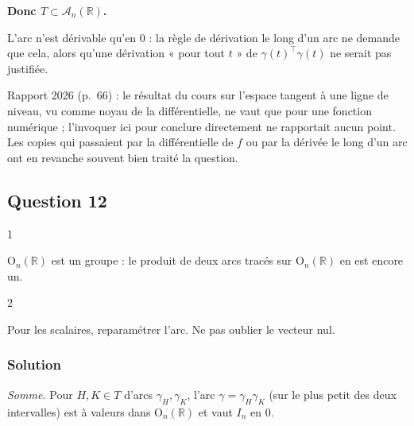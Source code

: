 \documentclass[11pt,a4paper]{article}
\begin{document}
\textbf{Donc \(T\subset{\mathcal{A}}_n(\mathbb{R})\).}

\begin{piege}

L'arc n'est dérivable qu'en 0 : la règle de dérivation le long d'un arc ne demande que cela, alors qu'une dérivation « pour tout \(t\) » de \(\gamma(t)^\top\gamma(t)\) ne serait pas justifiée.

\end{piege}

\begin{jury}

Rapport 2026 (p.~66) : le résultat du cours sur l'espace tangent à une ligne de niveau, vu comme noyau de la différentielle, ne vaut que pour une fonction numérique ; l'invoquer ici pour conclure directement ne rapportait aucun point. Les copies qui passaient par la différentielle de \(f\) ou par la dérivée le long d'un arc ont en revanche souvent bien traité la question.

\end{jury}

\hypertarget{question-12}{%
\subsection{Question 12}\label{question-12}}

\begin{indication}{1}

\({\mathrm{O}}_n(\mathbb{R})\) est un groupe : le produit de deux arcs tracés sur \({\mathrm{O}}_n(\mathbb{R})\) en est encore un.

\end{indication}

\begin{indication}{2}

Pour les scalaires, reparamétrer l'arc. Ne pas oublier le vecteur nul.

\end{indication}

\hypertarget{solution-11}{%
\subsubsection{Solution}\label{solution-11}}

\emph{Somme.} Pour \(H,K\in T\) d'arcs \(\gamma_H,\gamma_K\), l'arc \(\gamma=\gamma_H\gamma_K\) (sur le plus petit des deux intervalles) est à valeurs dans \({\mathrm{O}}_n(\mathbb{R})\) et vaut \(I_n\) en 0.
\end{document}
